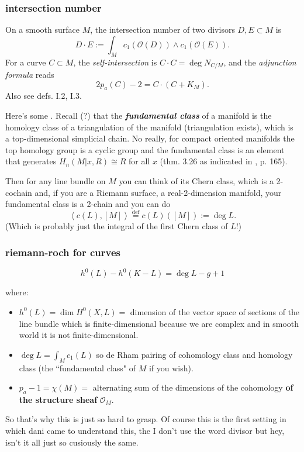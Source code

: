 \subsubsection{intersection number}
On a smooth surface \( M \), the intersection number of two divisors \( D, E \subset M \) is
\[
D \cdot E := \int_M c_1(\mathcal{O}(D)) \wedge c_1(\mathcal{O}(E)).
\]
For a curve \( C \subset M \), the \emph{self-intersection} is \( C \cdot C = \deg N_{C/M} \), and the \emph{adjunction formula} reads
\[
2p_a(C) - 2 = C \cdot (C + K_M).
\]
Also see \cite{beu} defs. I.2, I.3.

Here's some \cite{lec}. Recall (?) that the \textit{\textbf{fundamental class}} of a manifold is the homology class of a triangulation of the manifold (triangulation exists), which is a top-dimensional simplicial chain. No really, for compact oriented manifolds the top homology group is a cyclic group and the fundamental class is an element that generates \(H_n(M|x,R)\cong R\) for all \(x\) (thm. 3.26 \cite{hat} as indicated in \cite{lec}, p. 165).

Then for any line bundle on  \(M\) you can think of its Chern class, which is a 2-cochain and, if you are a Riemann surface, a real-2-dimension manifold, your fundamental class is a 2-chain and you can do
\[\left<c(L),[M]\right>\overset{\operatorname{def}}{=}c(L)([M]):=\operatorname{deg}L.\]
(Which is probably just the integral of the first Chern class of \(L\)!)


\subsubsection{riemann-roch for curves}
	\[\boxed{h^0(L)-h^0(K-L)=\operatorname{deg}L-g+1}\]

where:
\begin{itemize}
\item \(h^0(L)=\dim H^{0}(X,L)=\) dimension of the vector space of sections of the line bundle which is finite-dimensional because we are complex and in smooth world it is not finite-dimensional.
\item \(\operatorname{deg}L=\int_M c_1(L)\) so de Rham pairing of cohomology class and homology  class (the ``fundamental class" of \(M\) if you wish).
 \item \(p_a-1=\chi(M)=\) alternating sum of the dimensions of the cohomology \textbf{of the structure sheaf} \(\mathcal{O}_M\).
\end{itemize}
So that's why this is just so hard to grasp. Of course this is the first setting in which dani came to understand this, the I don't use the word divisor but hey, isn't it all just so cusiously the same.

